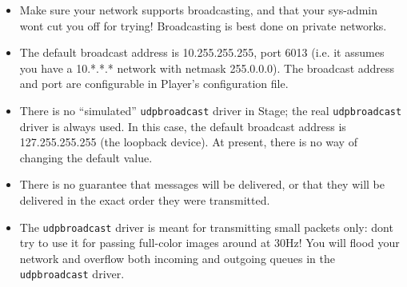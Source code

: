 \begin{itemize}
\item Make sure your network supports broadcasting, and that your
sys-admin wont cut you off for trying!  Broadcasting is best done
on private networks.
\item The default broadcast address is 10.255.255.255, port 6013
(i.e. it assumes you have a 10.*.*.* network with netmask 255.0.0.0).
The broadcast address and port are configurable in Player's configuration
file.
\item There is no ``simulated'' {\tt udpbroadcast} driver in Stage; the real
{\tt udpbroadcast} driver is always used.  In this case, the default 
broadcast address is 127.255.255.255 (the loopback device).  At present,
there is no way of changing the default value.
\item There is no guarantee that messages will be delivered, or 
that they will be delivered in the exact order they were transmitted.
\item The {\tt udpbroadcast} driver is meant for transmitting small packets
only: dont try to use it for passing full-color images around at 30Hz!
You will flood your network and overflow both incoming and outgoing queues
in the {\tt udpbroadcast} driver.
\end{itemize}

